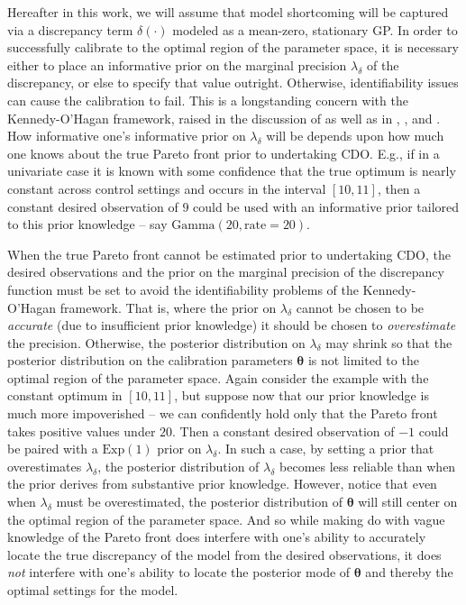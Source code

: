 \documentclass{article}
\begin{document}
Hereafter in this work, we will assume that model shortcoming will be captured via a discrepancy term $\delta(\cdot)$ modeled as a mean-zero, stationary GP. 
%
In order to successfully calibrate to the optimal region of the parameter space, it is necessary either to place an informative prior on the marginal precision $\lambda_\delta$ of the discrepancy, or else to specify that value outright. 
%
Otherwise, identifiability issues can cause the calibration to fail. This is a longstanding concern with the Kennedy-O'Hagan framework, raised in the discussion of \cite{Kennedy2001} as well as in \cite{Bayarri2007}, \cite{Tuo2015}, and \cite{Plumlee2017}.
%
How informative one's informative prior on $\lambda_\delta$ will be depends upon how much one knows about the true Pareto front prior to undertaking CDO.
%
E.g., if in a univariate case it is known with some confidence that the true optimum is nearly constant across control settings and occurs in the interval $[10,11]$, then a constant desired observation of $9$ could be used with an informative prior tailored to this prior knowledge -- say $\mathrm{Gamma}(20,\mathrm{rate}=20)$.
%

When the true Pareto front cannot be estimated prior to undertaking CDO, %
the desired observations and the prior on the marginal precision of the discrepancy function must be set to avoid the identifiability problems of the Kennedy-O'Hagan framework.
%
That is, where the prior on $\lambda_\delta$ cannot be chosen to be \emph{accurate} (due to insufficient prior knowledge) it should be chosen to \emph{overestimate} the precision.
%
Otherwise, the posterior distribution on $\lambda_\delta$ may shrink so that the posterior distribution on the calibration parameters $\boldsymbol \theta$ is not limited to the optimal region of the parameter space.
%
Again consider the example with the constant optimum in $[10,11]$, but suppose now that our prior knowledge is much more impoverished -- we can confidently hold only that the Pareto front takes positive values under $20$. 
%
Then a constant desired observation of $-1$ could be paired with a $\mathrm{Exp}(1)$ prior on $\lambda_\delta$.
%
In such a case, by setting a prior that overestimates $\lambda_\delta$, the posterior distribution of $\lambda_\delta$ becomes less reliable than when the prior derives from substantive prior knowledge.
%
However, notice that even when $\lambda_\delta$ must be overestimated, the posterior distribution of $\boldsymbol \theta$ will still center on the optimal region of the parameter space.
%
And so while making do with vague knowledge of the Pareto front does interfere with one's ability to accurately locate the true discrepancy of the model from the desired observations, it does \emph{not} interfere with one's ability to locate the posterior mode of $\boldsymbol \theta$ and thereby the optimal settings for the model.
%
\end{document}
